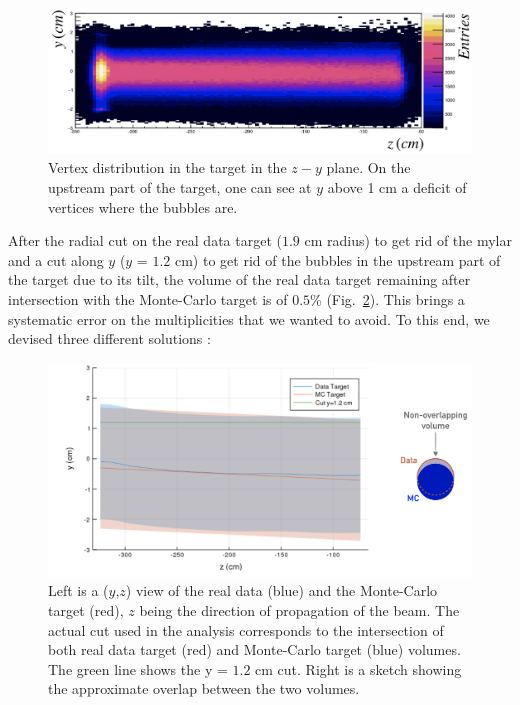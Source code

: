 \begin{figure}[!h]
  \centering
	\includegraphics[scale=0.45]{./gfx/targetview.png}
	\caption{Vertex distribution in the target in the $z-y$ plane. On the upstream part of the target, one can see at $y$ above 1 cm a deficit of vertices where the bubbles are.}
	\label{pic:targetview}
\end{figure}


After the radial cut on the real data target ($1.9$ cm radius) to get rid of the mylar and a cut along $y$ ($y$ = $1.2$ cm) to get rid of the bubbles in the upstream part of the target due to its tilt, the volume of the real data target remaining after intersection with the Monte-Carlo target is of $0.5$\% (Fig.~\ref{pic:Target}). This brings a systematic error on the multiplicities that we wanted to avoid. To this end, we devised three different solutions :

\begin{figure}[!h]
  \centering
	\includegraphics[scale=0.45]{./gfx/Targetcut.png}
	\caption{Left is a ($y$,$z$) view of the real data (blue) and the Monte-Carlo target (red), $z$ being the direction of propagation of the beam. The actual cut used in the analysis corresponds to the intersection of both real data target (red) and Monte-Carlo target (blue) volumes. The green line shows the y = $1.2$ cm cut. Right is a sketch showing the approximate overlap between the two volumes.}
	\label{pic:Target}
\end{figure}

